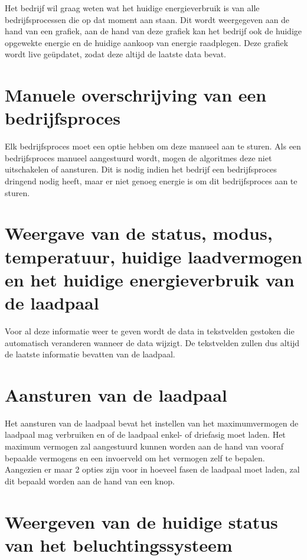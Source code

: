 Het bedrijf wil graag weten wat het huidige energieverbruik is van alle bedrijfsprocessen die op dat moment aan staan. Dit wordt weergegeven aan de hand van een grafiek, aan de hand van deze grafiek kan het bedrijf ook de huidige opgewekte energie en de huidige aankoop van energie raadplegen. Deze grafiek wordt live geüpdatet, zodat deze altijd de laatste data bevat.

\section{Manuele overschrijving van een bedrijfsproces}
\label{sec:analyse-vereisten-manuele-overschrijving-van-een-bedrijfsproces}

Elk bedrijfsproces moet een optie hebben om deze manueel aan te sturen. Als een bedrijfsproces manueel aangestuurd wordt, mogen de algoritmes deze niet uitschakelen of aansturen. Dit is nodig indien het bedrijf een bedrijfsproces dringend nodig heeft, maar er niet genoeg energie is om dit bedrijfsproces aan te sturen.

\section{Weergave van de status, modus, temperatuur, huidige laadvermogen en het huidige energieverbruik van de laadpaal}
\label{sec:analyse-vereisten-weergave-van-de-status-van-de-laadpaal}

Voor al deze informatie weer te geven wordt de data in tekstvelden gestoken die automatisch veranderen wanneer de data wijzigt. De tekstvelden zullen dus altijd de laatste informatie bevatten van de laadpaal.

\section{Aansturen van de laadpaal}
\label{sec:analyse-vereisten-aansturen-van-de-laadpaal}

Het aansturen van de laadpaal bevat het instellen van het maximumvermogen de laadpaal mag verbruiken en of de laadpaal enkel- of driefasig moet laden. Het maximum vermogen zal aangestuurd kunnen worden aan de hand van vooraf bepaalde vermogens en een invoerveld om het vermogen zelf te bepalen. Aangezien er maar 2 opties zijn voor in hoeveel fasen de laadpaal moet laden, zal dit bepaald worden aan de hand van een knop.

\section{Weergeven van de huidige status van het beluchtingssysteem}
\label{sec:analyse-vereisten-weergeven-van-de-huidige-status-van-het-beluchtingssysteem}

